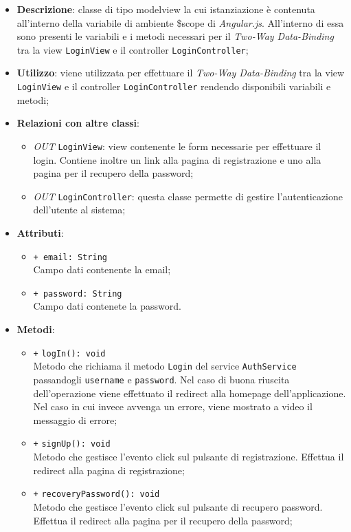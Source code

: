 	\begin{itemize}
		\item \textbf{Descrizione}: classe di tipo modelview la cui istanziazione è contenuta all'interno della variabile di ambiente \$scope di \textit{Angular.js}. All'interno di essa sono presenti le variabili e i metodi necessari per il \textit{Two-Way Data-Binding} tra la view \texttt{LoginView} e il controller \texttt{LoginController};
		\item \textbf{Utilizzo}: viene utilizzata per effettuare il \textit{Two-Way Data-Binding} tra la view \texttt{LoginView} e il controller \texttt{LoginController} rendendo disponibili variabili e metodi;
		\item \textbf{Relazioni con altre classi}: 
		\begin{itemize}
			\item \textit{OUT} \texttt{LoginView}: view contenente le form necessarie per effettuare il login. Contiene inoltre un link alla pagina di registrazione e uno alla pagina per il recupero della password; 
			\item \textit{OUT} \texttt{LoginController}: questa classe permette di gestire l'autenticazione dell'utente al sistema;
		\end{itemize}
		\item \textbf{Attributi}: 
		\begin{itemize}
			\item \texttt{+ email: String} \\ Campo dati contenente la email;
			\item \texttt{+ password: String} \\Campo dati contenete la password.
		\end{itemize}
		\item \textbf{Metodi}: 
		\begin{itemize}
			\item \texttt{+} \texttt{logIn(): void} \\
			Metodo che richiama il metodo \texttt{Login} del service \texttt{AuthService} passandogli \texttt{username} e \texttt{password}. Nel caso di buona riuscita dell'operazione viene effettuato il redirect alla homepage dell'applicazione. Nel caso in cui invece avvenga un errore, viene mostrato a video il messaggio di errore;
			\item \texttt{+} \texttt{signUp(): void} \\
			Metodo che gestisce l’evento click sul pulsante di registrazione. Effettua il redirect alla pagina di registrazione;
			\item \texttt{+} \texttt{recoveryPassword(): void} \\
			Metodo che gestisce l’evento click sul pulsante di recupero password. Effettua il redirect alla pagina per il recupero della password; 
		\end{itemize}
	\end{itemize}
	
